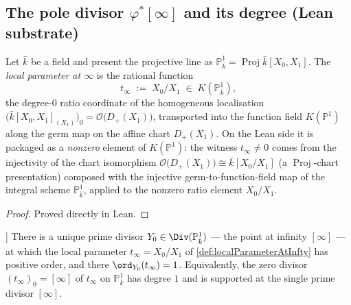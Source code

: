 \subsection{The pole divisor \(\varphi^*[\infty]\) and its degree (Lean substrate)}
\begin{definition}
  \label{def:localParameterAtInfty}
  Let \(\bar k\) be a field and present the projective line as
  \(\mathbb P^1_{\bar k} = \operatorname{Proj} \bar k[X_0, X_1]\). The
  \emph{local parameter at \(\infty\)} is the rational function
  \[
    t_\infty \;:=\; X_0 / X_1 \;\in\; K(\mathbb P^1_{\bar k}),
  \]
  the degree-\(0\) ratio coordinate of the homogeneous localisation
  \(\bigl(\bar k[X_0, X_1]_{(X_1)}\bigr)_0 = \mathcal O\!\bigl(D_+(X_1)\bigr)\),
  transported into the function field \(K(\mathbb P^1)\) along the germ map
  on the affine chart \(D_+(X_1)\). On the Lean side it is packaged as a
  \emph{nonzero} element of \(K(\mathbb P^1)\): the witness \(t_\infty \neq 0\)
  comes from the injectivity of the chart isomorphism
  \(\mathcal O\!\bigl(D_+(X_1)\bigr) \cong \bar k[X_0/X_1]\) (a
  \(\operatorname{Proj}\)-chart presentation) composed with the injective
  germ-to-function-field map of the integral scheme \(\mathbb P^1_{\bar k}\),
  applied to the nonzero ratio element \(X_0 / X_1\).
\end{definition}
\begin{proof}

\leanok
  Proved directly in Lean.
\end{proof}
\begin{lemma}\leanok
[\(t_\infty\) is a uniformiser at \([\infty]\)]
  \label{lem:localParameterAtInfty_uniformiser_witness}
  There is a unique prime divisor \(Y_0 \in \Div(\mathbb P^1_{\bar k})\) — the
  point at infinity \([\infty]\) — at which the local parameter
  \(t_\infty = X_0 / X_1\) of \cref{def:localParameterAtInfty} has positive
  order, and there \(\ord_{Y_0}(t_\infty) = 1\). Equivalently, the zero divisor
  \((t_\infty)_0 = [\infty]\) of \(t_\infty\) on \(\mathbb P^1_{\bar k}\) has
  degree \(1\) and is supported at the single prime divisor \([\infty]\).
\end{lemma}
